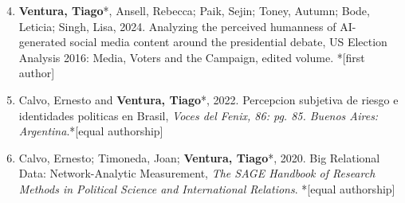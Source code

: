 \documentclass[letterpaper, 11pt]{article}
\newenvironment{benumerate}[1]{
    \let\oldItem\item
    \def\item{\addtocounter{enumi}{-2}\oldItem}
    \begin{enumerate}[leftmargin=2em]
    \setcounter{enumi}{#1}
    \addtocounter{enumi}{1}
}{
    \end{enumerate}
}
\begin{document}
    \begin{benumerate}{3}

    \item \textbf{Ventura, Tiago}*, Ansell, Rebecca; Paik, Sejin; Toney, Autumn; Bode, Leticia; Singh, Lisa, 2024. Analyzing the perceived humanness of AI-generated social media content around the presidential debate, US Election Analysis 2016: Media, Voters and the Campaign, edited volume. *[first author]


    \item   Calvo, Ernesto and \textbf{Ventura, Tiago}*, 2022. Percepcion subjetiva de riesgo e identidades politicas en Brasil, \textit{Voces del Fenix, 86: pg. 85. Buenos Aires: Argentina}.*[equal authorship]

    \item  Calvo, Ernesto; Timoneda, Joan; \textbf{Ventura, Tiago}*, 2020. Big Relational Data: Network-Analytic Measurement, \textit{The SAGE Handbook of Research Methods in Political Science and International Relations}. *[equal authorship]

    \end{benumerate}






\end{document}
